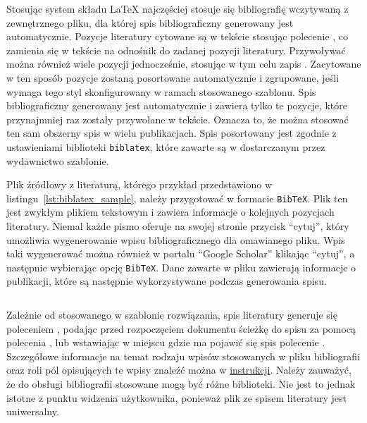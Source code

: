 Stosując system składu \LaTeX{} najczęściej stosuje się bibliografię wczytywaną z zewnętrznego pliku, dla której spis bibliograficzny generowany jest automatycznie. Pozycje literatury cytowane są w tekście stosując polecenie \texttt{\cite{nazwa_pozycji}}, co zamienia się w tekście na odnośnik do zadanej pozycji literatury. Przywoływać można również wiele pozycji jednocześnie, stosując w tym celu zapis \texttt{\cite{nazwa1, nazwa2}}. Zacytowane w ten sposób pozycje zostaną posortowane automatycznie i zgrupowane, jeśli wymaga tego styl skonfigurowany w ramach stosowanego szablonu. Spis bibliograficzny generowany jest automatycznie i zawiera tylko te pozycje, które przynajmniej raz zostały przywołane w tekście. Oznacza to, że można stosować ten sam obszerny spis w wielu publikacjach. Spis posortowany jest zgodnie z ustawieniami biblioteki \texttt{biblatex}, które zawarte są w dostarczanym przez wydawnictwo szablonie.

Plik źródłowy z literaturą, którego przykład przedstawiono w listingu~\ref{lst:biblatex_sample}, należy przygotować w formacie \texttt{BibTeX}. Plik ten jest zwykłym plikiem tekstowym i zawiera informacje o kolejnych pozycjach literatury. Niemal każde pismo oferuje na swojej stronie przycisk \enquote{cytuj}, który umożliwia wygenerowanie wpisu bibliograficznego dla omawianego pliku. Wpis taki wygenerować można również w portalu \enquote{Google Scholar} klikając \enquote{cytuj}, a następnie wybierając opcję \texttt{BibTeX}. Dane zawarte w pliku zawierają informacje o publikacji, które są następnie wykorzystywane podczas generowania spisu.

\begin{listing}[hbt]
\inputminted{bibtex}{skrypty/biblatex_sample.bib}
\end{listing}

Zależnie od stosowanego w szablonie rozwiązania, spis literatury generuje się poleceniem \texttt{\printbibliography}, podając przed rozpoczęciem dokumentu ścieżkę do spisu za pomocą polecenia \texttt{}, lub wstawiając w miejscu gdzie ma pojawić się spis polecenie \texttt{}. Szczegółowe informacje na temat rodzaju wpisów stosowanych w pliku bibliografii oraz roli pól opisujących te wpisy znaleźć można w \href{https://www.overleaf.com/learn/latex/Bibliography_management_in_LaTeX}{instrukcji}. Należy zauważyć, że do obsługi bibliografii stosowane mogą być różne biblioteki. Nie jest to jednak istotne z punktu widzenia użytkownika, ponieważ plik ze spisem literatury jest uniwersalny.

